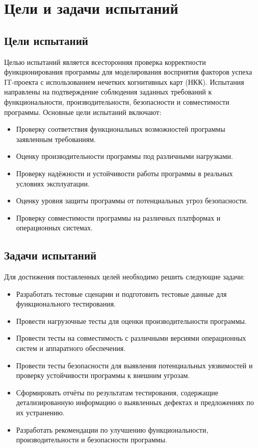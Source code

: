 \documentclass{article}
\begin{document}
    \newpage
    \section{Цели и задачи испытаний}
    \subsection{Цели испытаний}

    Целью испытаний является всесторонняя проверка корректности функционирования программы для моделирования восприятия факторов успеха IT-проекта с использованием нечетких когнитивных карт (НКК). Испытания направлены на подтверждение соблюдения заданных требований к функциональности, производительности, безопасности и совместимости программы. Основные цели испытаний включают:

    \begin{itemize}
        \item Проверку соответствия функциональных возможностей программы заявленным требованиям.
        \item Оценку производительности программы под различными нагрузками.
        \item Проверку надёжности и устойчивости работы программы в реальных условиях эксплуатации.
        \item Оценку уровня защиты программы от потенциальных угроз безопасности.
        \item Проверку совместимости программы на различных платформах и операционных системах.
    \end{itemize}

    \subsection{Задачи испытаний}

    Для достижения поставленных целей необходимо решить следующие задачи:

    \begin{itemize}
        \item Разработать тестовые сценарии и подготовить тестовые данные для функционального тестирования.
        \item Провести нагрузочные тесты для оценки производительности программы.
        \item Провести тесты на совместимость с различными версиями операционных систем и аппаратного обеспечения.
        \item Провести тесты безопасности для выявления потенциальных уязвимостей и проверку устойчивости программы к внешним угрозам.
        \item Сформировать отчёты по результатам тестирования, содержащие детализированную информацию о выявленных дефектах и предложениях по их устранению.
        \item Разработать рекомендации по улучшению функциональности, производительности и безопасности программы.
    \end{itemize}
\end{document}
